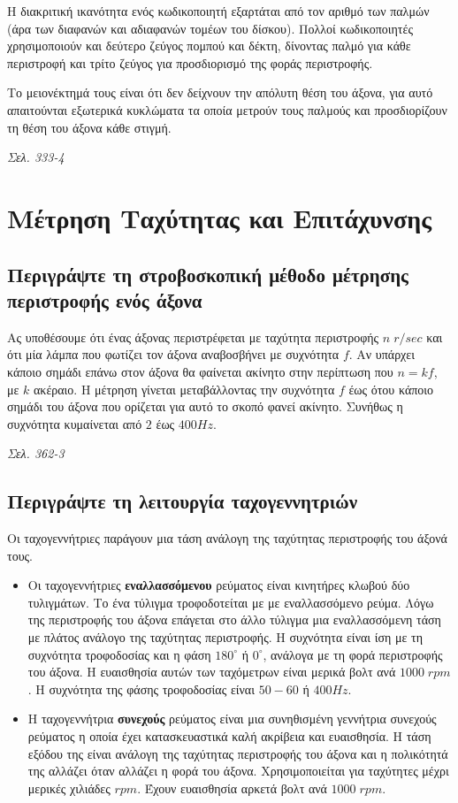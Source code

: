 \documentclass{article}
\begin{document}
Η διακριτική ικανότητα ενός κωδικοποιητή εξαρτάται από τον αριθμό των παλμών (άρα των διαφανών και αδιαφανών τομέων του δίσκου). Πολλοί κωδικοποιητές χρησιμοποιούν 
και δεύτερο ζεύγος πομπού και δέκτη, δίνοντας παλμό για κάθε περιστροφή και τρίτο ζεύγος για προσδιορισμό της φοράς περιστροφής. 

Το μειονέκτημά τους είναι ότι δεν δείχνουν την απόλυτη θέση του άξονα, για αυτό απαιτούνται εξωτερικά κυκλώματα τα οποία μετρούν τους παλμούς και προσδιορίζουν τη θέση του
άξονα κάθε στιγμή.

\emph{Σελ. 333-4}


\section{Μέτρηση Ταχύτητας και Επιτάχυνσης}
\subsection{Περιγράψτε τη στροβοσκοπική μέθοδο μέτρησης περιστροφής ενός άξονα}
Ας υποθέσουμε ότι ένας άξονας περιστρέφεται με ταχύτητα περιστροφής $n\;r/sec$ και ότι μία λάμπα που φωτίζει τον άξονα αναβοσβήνει με συχνότητα $f$. Αν υπάρχει κάποιο 
σημάδι επάνω στον άξονα θα φαίνεται ακίνητο στην περίπτωση που $n=kf$, με $k$ ακέραιο. Η μέτρηση γίνεται μεταβάλλοντας την συχνότητα $f$ έως ότου κάποιο σημάδι του άξονα
που ορίζεται για αυτό το σκοπό φανεί ακίνητο. Συνήθως η συχνότητα κυμαίνεται από $2$ έως $400 Ηz$.

\emph{Σελ. 362-3}

\subsection{Περιγράψτε τη λειτουργία ταχογεννητριών}
Οι ταχογεννήτριες παράγουν μια τάση ανάλογη της ταχύτητας περιστροφής του άξονά τους.

\begin{itemize}
    \item Οι ταχογεννήτριες \textbf{εναλλασσόμενου} ρεύματος είναι κινητήρες κλωβού δύο τυλιγμάτων. Το ένα τύλιγμα τροφοδοτείται με με εναλλασσόμενο ρεύμα. Λόγω της 
        περιστροφής του άξονα επάγεται στο άλλο τύλιγμα μια εναλλασσόμενη τάση με πλάτος ανάλογο της ταχύτητας περιστροφής. Η συχνότητα είναι ίση με τη συχνότητα 
        τροφοδοσίας και η φάση $180^\circ$ ή $0^\circ$, ανάλογα με τη φορά περιστροφής του άξονα. Η ευαισθησία αυτών των ταχόμετρων είναι μερικά βολτ ανά $1000\; rpm$.
        Η συχνότητα της φάσης τροφοδοσίας είναι $50-60$ ή $400Hz$. 
    \item Η ταχογεννήτρια \textbf{συνεχούς} ρεύματος είναι μια συνηθισμένη γεννήτρια συνεχούς ρεύματος η οποία έχει κατασκευαστικά καλή ακρίβεια και ευαισθησία. Η
        τάση εξόδου της είναι ανάλογη της ταχύτητας περιστροφής του άξονα και η πολικότητά της αλλάζει όταν αλλάζει η φορά του άξονα. Χρησιμοποιείται για ταχύτητες
        μέχρι μερικές χιλιάδες $rpm$. Έχουν ευαισθησία αρκετά βολτ ανά $1000\; rpm$.
\end{itemize}
\end{document}
